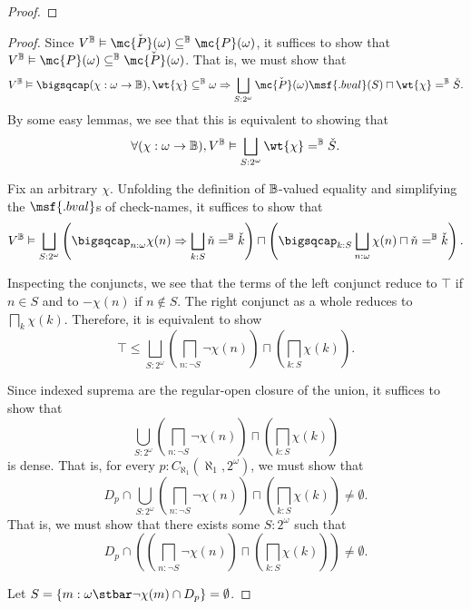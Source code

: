 \documentclass[11pt]{article}
\newcommand{\bval}{\msf{.bval}}
\begin{document}
\begin{proof}
\end{proof}

\begin{proof}
  Since $V^\B \vDash \check{\mc{P}(\omega)} \subseteq^\B \mc{P}(\omega)$, it suffices to show that $V^\B \vDash \mc{P}(\omega) \subseteq^\B  \check{\mc{P}(\omega)} $. That is, we must show that
  $$
V^\B \vDash \bigsqcap (\chi : \omega \to \B), \wt{\chi} \subseteq^\B \omega \Rightarrow \bigsqcup_{S : 2^\omega} \check{\mc{P}(\omega)}\bval(S) \sqcap \wt{\chi} =^\B \check{S}.
$$
By some easy lemmas, we see that this is equivalent to showing that
$$
\forall (\chi : \omega \to \B), V^\B \vDash \bigsqcup_{S : 2^\omega} \wt{\chi} =^\B \check{S}.
$$

Fix an arbitrary $\chi$. Unfolding the definition of $\mathbb{B}$-valued equality and simplifying the $\bval$s of check-names, it suffices to show that
$$
V^\B \vDash \bigsqcup_{S : 2^\omega} \left(\bigsqcap_{n : \omega} \chi(n) \Rightarrow \bigsqcup_{k : S} \check{n} =^\B \check{k} \right) \sqcap \left( \bigsqcap_{k : S} \bigsqcup_{n : \omega} \chi(n) \sqcap \check{n} =^\B \check{k} \right).
$$

Inspecting the conjuncts, we see that the terms of the left conjunct reduce to $\top$ if $n \in S$ and to $- \chi(n)$ if $n \notin S$. The right conjunct as a whole reduces to $\bigsqcap_k \chi(k)$. Therefore, it is equivalent to show
$$
\top \leq \bigsqcup_{S : 2^\omega} \left(\bigsqcap_{n : \neg S} \neg \chi(n)\right) \sqcap \left(  \bigsqcap_{k : S} \chi(k) \right).
$$

Since indexed suprema are the regular-open closure of the union, it suffices to show that
$$
\bigcup_{S : 2^\omega} \left(\bigsqcap_{n : \neg S} \neg \chi(n)\right) \sqcap \left(  \bigsqcap_{k : S} \chi(k) \right)
$$
is dense. That is, for every $p : C_{\aleph_1}(\aleph_1, 2^\omega)$, we must show that
$$
D_p \cap \bigcup_{S : 2^\omega} \left(\bigsqcap_{n : \neg S} \neg \chi(n)\right) \sqcap \left(  \bigsqcap_{k : S} \chi(k) \right) \neq \emptyset.
$$
That is, we must show that there exists some $S : 2^\omega$ such that
$$
D_p \cap \left(\left(\bigsqcap_{n : \neg S} \neg \chi(n)\right) \sqcap \left(  \bigsqcap_{k : S} \chi(k) \right) \right) \neq \emptyset.
$$

Let $S = \{ m : \omega \stbar \neg \chi(m) \cap D_p \} = \emptyset $.


\end{proof}
\end{document}
